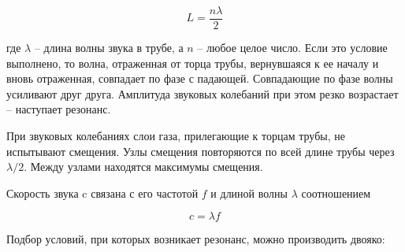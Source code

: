 \documentclass[a4paper, 12pt]{article}
\begin{document}
\bigskip

\begin{equation} \label{lambda}
    L=\frac{n \lambda}{2}    
\end{equation}

\bigskip

где $ \lambda $ -- длина волны звука в трубе, а $ n $ -- любое целое число. Если это условие выполнено, то волна, отраженная от торца трубы, вернувшаяся к ее началу и вновь отраженная, совпадает по фазе с падающей. Совпадающие по фазе волны усиливают друг друга. Амплитуда звуковых колебаний при этом резко возрастает -- наступает резонанс.

При звуковых колебаниях слои газа, прилегающие к торцам трубы, не испытывают смещения. Узлы смещения повторяются по всей длине трубы через $ \lambda/2 $. Между узлами находятся максимумы смещения.

Скорость звука c связана с его частотой $ f $ и длиной волны $ \lambda $ соотношением

\bigskip

\begin{equation}\label{lambda_f}
c=\lambda f
\end{equation}

\bigskip
\newpage

Подбор условий, при которых возникает резонанс, можно производить двояко:
\end{document}
